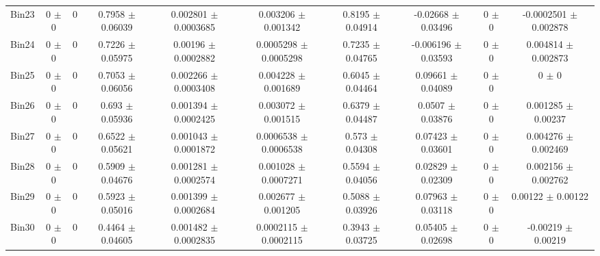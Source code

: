 \begin{tabular}{@{\extracolsep{4pt}}lccccccccc@{}}
     Bin23 & 0 $\pm$ 0 & 0 & 0.7958 $\pm$ 0.06039 & 0.002801 $\pm$ 0.0003685 & 0.003206 $\pm$ 0.001342 & 0.8195 $\pm$ 0.04914 & -0.02668 $\pm$ 0.03496 & 0 $\pm$ 0 & -0.0002501 $\pm$ 0.002878 \\ 
     Bin24 & 0 $\pm$ 0 & 0 & 0.7226 $\pm$ 0.05975 & 0.00196 $\pm$ 0.0002882 & 0.0005298 $\pm$ 0.0005298 & 0.7235 $\pm$ 0.04765 & -0.006196 $\pm$ 0.03593 & 0 $\pm$ 0 & 0.004814 $\pm$ 0.002873 \\ 
     Bin25 & 0 $\pm$ 0 & 0 & 0.7053 $\pm$ 0.06056 & 0.002266 $\pm$ 0.0003408 & 0.004228 $\pm$ 0.001689 & 0.6045 $\pm$ 0.04464 & 0.09661 $\pm$ 0.04089 & 0 $\pm$ 0 & 0 $\pm$ 0 \\ 
     Bin26 & 0 $\pm$ 0 & 0 & 0.693 $\pm$ 0.05936 & 0.001394 $\pm$ 0.0002425 & 0.003072 $\pm$ 0.001515 & 0.6379 $\pm$ 0.04487 & 0.0507 $\pm$ 0.03876 & 0 $\pm$ 0 & 0.001285 $\pm$ 0.00237 \\ 
     Bin27 & 0 $\pm$ 0 & 0 & 0.6522 $\pm$ 0.05621 & 0.001043 $\pm$ 0.0001872 & 0.0006538 $\pm$ 0.0006538 & 0.573 $\pm$ 0.04308 & 0.07423 $\pm$ 0.03601 & 0 $\pm$ 0 & 0.004276 $\pm$ 0.002469 \\ 
     Bin28 & 0 $\pm$ 0 & 0 & 0.5909 $\pm$ 0.04676 & 0.001281 $\pm$ 0.0002574 & 0.001028 $\pm$ 0.0007271 & 0.5594 $\pm$ 0.04056 & 0.02829 $\pm$ 0.02309 & 0 $\pm$ 0 & 0.002156 $\pm$ 0.002762 \\ 
     Bin29 & 0 $\pm$ 0 & 0 & 0.5923 $\pm$ 0.05016 & 0.001399 $\pm$ 0.0002684 & 0.002677 $\pm$ 0.001205 & 0.5088 $\pm$ 0.03926 & 0.07963 $\pm$ 0.03118 & 0 $\pm$ 0 & 0.00122 $\pm$ 0.00122 \\ 
     Bin30 & 0 $\pm$ 0 & 0 & 0.4464 $\pm$ 0.04605 & 0.001482 $\pm$ 0.0002835 & 0.0002115 $\pm$ 0.0002115 & 0.3943 $\pm$ 0.03725 & 0.05405 $\pm$ 0.02698 & 0 $\pm$ 0 & -0.00219 $\pm$ 0.00219 \\ 
\hline\hline
  \end{tabular}
